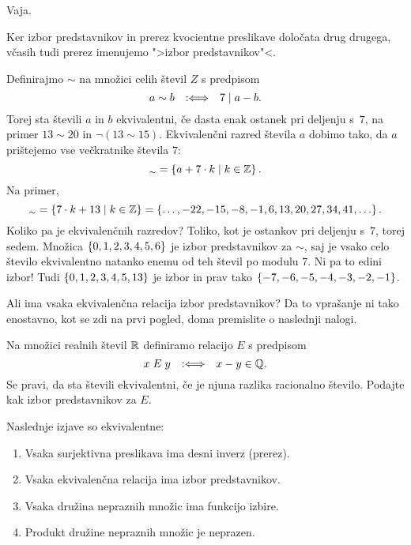 \begin{dokaz}
  Vaja.
\end{dokaz}

Ker izbor predstavnikov in prerez kvocientne preslikave določata drug drugega, včasih tudi
prerez imenujemo ">izbor predstavnikov"<.

\begin{primer}
  Definirajmo $\sim$ na množici celih števil $Z$ s predpisom
  \begin{equation*}
    a \sim b \quad {{:}{\Longleftrightarrow}}\quad 7 \mathrel{|} a - b.
  \end{equation*}
  Torej sta števili $a$ in $b$ ekvivalentni, če dasta enak ostanek pri deljenju s~$7$,
  na primer $13 \sim 20$ in $\lnot (13 \sim 15)$.
  Ekvivalenčni razred števila $a$ dobimo tako, da $a$ prištejemo vse večkratnike števila $7$:
  \begin{equation*}
    [a]_{\sim} = \set{ a + 7 \cdot k \such k \in \ZZ }.
  \end{equation*}
  Na primer,
  \begin{equation*}
    [13]_\sim = \set{ 7 \cdot k + 13 \such k \in \ZZ }
           = \set{ \ldots, -22, -15, -8, -1, 6, 13, 20, 27, 34, 41, \ldots}.
  \end{equation*}
  Koliko pa je ekvivalenčnih razredov? Toliko, kot je ostankov pri deljenju s~$7$, torej sedem. Množica
  $\left\{0, 1, 2, 3, 4, 5, 6\right\}$ je izbor predstavnikov za $\sim$, saj je vsako celo število ekvivalentno natanko enemu od
  teh števil po modulu $7$.
  Ni pa to edini izbor! Tudi $\left\{0, 1, 2, 3, 4, 5, 13\right\}$ je izbor in prav tako $\left\{-7, -6, -5, -4, -3, -2, -1\right\}$.
\end{primer}

Ali ima vsaka ekvivalenčna relacija izbor predstavnikov? Da to vprašanje ni tako
enostavno, kot se zdi na prvi pogled, doma premislite o naslednji nalogi.

\begin{naloga}
  Na množici realnih števil $\mathbb{R}$ definiramo relacijo $E$ s predpisom
  \begin{equation*}
    x \mathrel{E} y  \quad {{:}{\Longleftrightarrow}}\quad  x - y \in \mathbb{Q}.
  \end{equation*}
  Se pravi, da sta števili ekvivalentni, če je njuna razlika racionalno število. Podajte kak
  izbor predstavnikov za $E$.
\end{naloga}

\begin{izrek}
  Naslednje izjave so ekvivalentne:
  \begin{enumerate}
  \item Vsaka surjektivna preslikava ima desni inverz (prerez).
  \item Vsaka ekvivalenčna relacija ima izbor predstavnikov.
  \item Vsaka družina nepraznih množic ima funkcijo izbire.
  \item Produkt družine nepraznih množic je neprazen.
  \end{enumerate}
\end{izrek}

